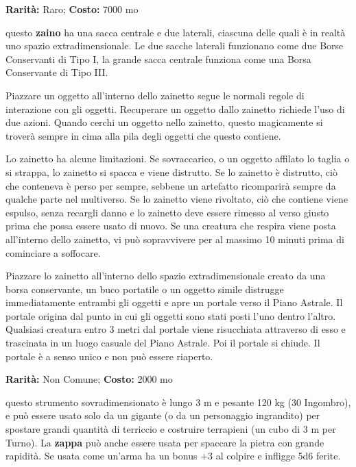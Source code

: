 \begin{multicols}{2}

\textbf{Rarità:} Raro; \textbf{Costo:} 7000 mo

questo \textbf{zaino} ha una sacca centrale e due laterali, ciascuna delle quali è in realtà uno spazio extradimensionale.
Le due sacche laterali funzionano come due Borse Conservanti di Tipo I, la grande sacca centrale funziona come una Borsa Conservante di Tipo III.

Piazzare un oggetto all'interno dello zainetto segue le normali regole di interazione con gli oggetti. Recuperare un oggetto dallo zainetto richiede l'uso di due azioni. Quando cerchi un oggetto nello zainetto, questo magicamente si troverà sempre in cima alla pila degli oggetti che questo contiene.

Lo zainetto ha alcune limitazioni. Se sovraccarico, o un oggetto affilato lo taglia o si strappa, lo zainetto si spacca e viene distrutto. Se lo zainetto è distrutto, ciò che conteneva è perso per sempre, sebbene un artefatto ricomparirà sempre da qualche parte nel multiverso. Se lo zainetto viene rivoltato, ciò che contiene viene espulso, senza recargli danno e lo zainetto deve essere rimesso al verso giusto prima che possa essere usato di nuovo. Se una creatura che respira viene posta all'interno dello zainetto, vi può sopravvivere per al massimo 10 minuti prima di cominciare a soffocare.

Piazzare lo zainetto all'interno dello spazio extradimensionale creato da una borsa conservante, un buco portatile o un oggetto simile distrugge immediatamente entrambi gli oggetti e apre un portale verso il Piano Astrale. Il portale origina dal punto in cui gli oggetti sono stati posti l'uno dentro l'altro. Qualsiasi creatura entro 3 metri dal portale viene risucchiata attraverso di esso e trascinata in un luogo casuale del Piano Astrale. Poi il portale si chiude. Il portale è a senso unico e non può essere riaperto.


\textbf{Rarità:} Non Comune; \textbf{Costo:} 2000 mo

questo strumento sovradimensionato è lungo 3 m e pesante 120 kg (30 Ingombro), e può essere usato solo da un gigante (o da un personaggio ingrandito) per spostare grandi quantità di terriccio e costruire terrapieni (un cubo di 3 m per Turno). La \textbf{zappa} può anche essere usata per spaccare la pietra con grande rapidità. Se usata come un'arma ha un bonus +3 al colpire e infligge 5d6 ferite.


\end{multicols}
